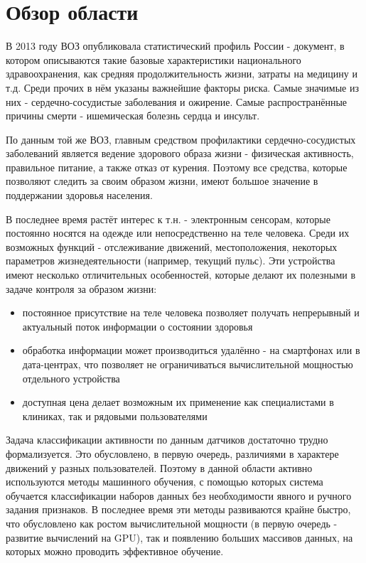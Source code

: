 \section{Обзор области}

В 2013 году ВОЗ опубликовала статистический профиль России - документ, в котором описываются такие базовые характеристики национального здравоохранения, как средняя продолжительность жизни, затраты на медицину и т.д\cite{who_russia_profile}. Среди прочих в нём указаны важнейшие факторы риска. Самые значимые из них - сердечно-сосудистые заболевания и ожирение. Самые распространённые причины смерти - ишемическая болезнь сердца и инсульт. 

По данным той же ВОЗ\cite{who_cardiovascular}, главным средством профилактики сердечно-сосудистых заболеваний является ведение здорового образа жизни - физическая активность, правильное питание, а также отказ от курения. Поэтому все средства, которые позволяют следить за своим образом жизни, имеют большое значение в поддержании здоровья населения.

В последнее время растёт интерес к т.н.  - электронным сенсорам, которые постоянно носятся на одежде или непосредственно на теле человека. Среди их возможных функций - отслеживание движений, местоположения, некоторых параметров жизнедеятельности (например, текущий пульс). Эти устройства имеют несколько отличительных особенностей, которые делают их полезными в задаче контроля за образом жизни:
\begin{itemize}
\item постоянное присутствие на теле человека позволяет получать непрерывный и актуальный поток информации о состоянии здоровья
\item обработка информации может производиться удалённо - на смартфонах или в дата-центрах, что позволяет не ограничиваться вычислительной мощностью отдельного устройства
\item доступная цена делает возможным их применение как специалистами в клиниках, так и рядовыми пользователями
\end{itemize}

Задача классификации активности по данным датчиков достаточно трудно формализуется. Это обусловлено, в первую очередь, различиями в характере движений у разных пользователей. Поэтому в данной области активно используются методы машинного обучения, с помощью которых система обучается классификации наборов данных без необходимости явного и ручного задания признаков. В последнее время эти методы развиваются крайне быстро, что обусловлено как ростом вычислительной мощности (в первую очередь - развитие вычислений на GPU), так и появлению больших массивов данных, на которых можно проводить эффективное обучение.

